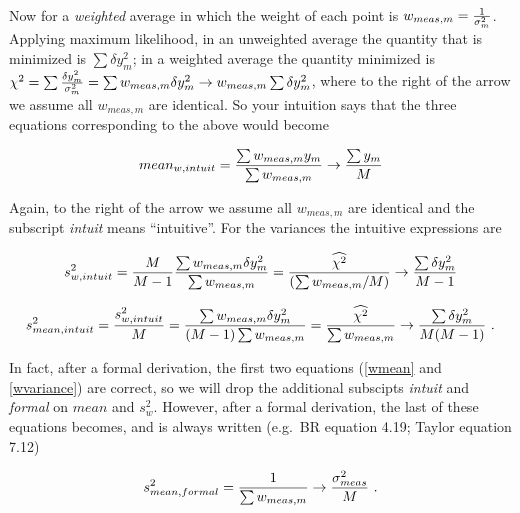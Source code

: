 \documentclass[psfig,preprint]{aastex}
\begin{document}
        Now for a {\it weighted} average in which the weight of each
point is $w_{meas,m} = {1 \over \sigma_{m}^2}$.  Applying maximum
likelihood, in an unweighted average the quantity that is minimized is
$\sum \delta y_m^2$; in a weighted average the quantity minimized is
$\chi^2 = \sum {\delta y_m^2 \over \sigma_{m}^2} = \sum w_{meas,m}
\delta y_m^2 \rightarrow w_{meas,m} \sum \delta y_m^2$, where to the
right of the arrow we assume all $w_{meas,m}$ are identical.  So your
intuition says that the three equations corresponding to the above would
become

\begin{mathletters} \label{wgtideal}
\begin{equation} \label{wmean}  
mean_{w, intuit} = {\sum w_{meas,m}y_m \over \sum w_{meas,m}} \rightarrow { \sum y_m \over M}
\end{equation}

\noindent Again, to the right of the arrow we assume all $w_{meas,m}$
are identical and the subscript {\it intuit} means ``intuitive''. For
the variances the intuitive expressions are

\begin{equation} \label{wvariance}
s_{w,intuit}^2 = 
  {M \over M-1} {\sum w_{meas,m} \delta y_m^2 \over \sum w_{meas,m}} 
  = {\widehat{\chi^2} \over (\sum w_{meas,m}/M)} 
   \rightarrow {\sum \delta y_m^2 \over M-1}
\end{equation}

\begin{equation} \label{wmeanvariancecc}
s_{mean,intuit}^2 = {s_{w,intuit}^2 \over M} = 
  {\sum w_{meas,m} \delta y_m^2 \over (M-1) \sum w_{meas,m}} 
   = {\widehat{\chi^2} \over \sum w_{meas,m}}
   \rightarrow {\sum {\delta y_m^2} \over M(M-1) } \ .
\end{equation}   
\end{mathletters}

\noindent In fact, after a formal derivation, the first two equations
(\ref {wmean} and \ref{wvariance}) are correct, so we will drop the
additional subscipts {\it intuit} and {\it formal} on $mean$ and
$s_w^2$.  However, after a formal derivation, the last of these
equations becomes, and is always written (e.g.\ BR equation 4.19; Taylor
equation 7.12)
        
\begin{equation} \label{wmeanvariancebb}
s_{mean,formal}^2 = {1 \over \sum w_{meas,m}} \rightarrow { \sigma_{meas}^2 \over M}
\ .
\end{equation}
\end{document}
